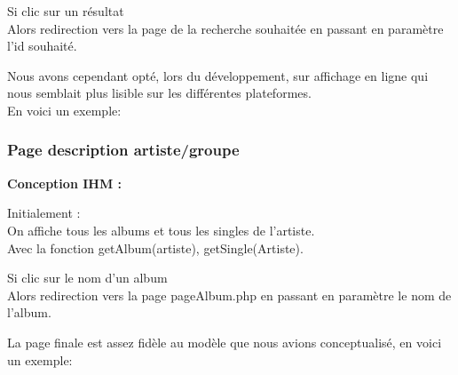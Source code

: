             \begin{paragraphe}
                Si clic sur un résultat\\
                Alors redirection vers la page de la recherche souhaitée en passant en paramètre l'id souhaité.
            \end{paragraphe}

            \begin{paragraphe}
                Nous avons cependant opté, lors du développement, sur affichage en ligne qui nous semblait plus lisible sur les différentes plateformes.\\
                En voici un exemple:
            \end{paragraphe}

        \clearpage

		\subsubsection{Page description artiste/groupe}

			\begin{paragraphe}
				\textbf{Conception IHM :}
			\end{paragraphe}

			\begin{paragraphe}
				Initialement :\\
				On affiche tous les albums et tous les singles de l'artiste.\\
				Avec la fonction getAlbum(artiste), getSingle(Artiste).
			\end{paragraphe}

			\begin{paragraphe}
				Si clic sur le nom d'un album\\
				Alors redirection vers la page pageAlbum.php en passant en paramètre le nom de l'album.
			\end{paragraphe}


            \begin{paragraphe}
                La page finale est assez fidèle au modèle que nous avions conceptualisé, en voici un exemple:
            \end{paragraphe}


